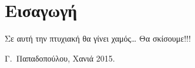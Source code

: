 \chapter*{Εισαγωγή}

Σε αυτή την πτυχιακή θα γίνει χαμός\ldots
Θα σκίσουμε!!!




\bigskip

\begin{flushright}
\begin{minipage}{150pt}
Γ.\ Παπαδοπούλου, Χανιά 2015.
\end{minipage}
\end{flushright}



\endinput

